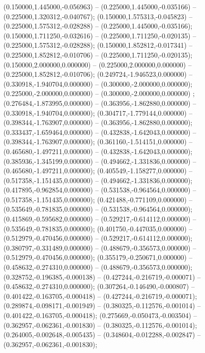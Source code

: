  (0.150000,1.445000,-0.056963) -- (0.225000,1.445000,-0.035166) -- (0.225000,1.320312,-0.040767);
 (0.150000,1.575313,-0.045823) -- (0.225000,1.575312,-0.028288) -- (0.225000,1.445000,-0.035166);
 (0.150000,1.711250,-0.032616) -- (0.225000,1.711250,-0.020135) -- (0.225000,1.575312,-0.028288);
 (0.150000,1.852812,-0.017341) -- (0.225000,1.852812,-0.010706) -- (0.225000,1.711250,-0.020135);
 (0.150000,2.000000,0.000000) -- (0.225000,2.000000,0.000000) -- (0.225000,1.852812,-0.010706);
 (0.249724,-1.946523,0.000000) -- (0.330918,-1.940704,0.000000) -- (0.300000,-2.000000,0.000000);
 (0.225000,-2.000000,0.000000) -- (0.300000,-2.000000,0.000000) ;
 (0.276484,-1.873995,0.000000) -- (0.363956,-1.862880,0.000000) -- (0.330918,-1.940704,0.000000);
 (0.304717,-1.779144,0.000000) -- (0.398344,-1.763907,0.000000) -- (0.363956,-1.862880,0.000000);
 (0.333437,-1.659464,0.000000) -- (0.432838,-1.642043,0.000000) -- (0.398344,-1.763907,0.000000);
 (0.361160,-1.514151,0.000000) -- (0.465680,-1.497211,0.000000) -- (0.432838,-1.642043,0.000000);
 (0.385936,-1.345199,0.000000) -- (0.494662,-1.331836,0.000000) -- (0.465680,-1.497211,0.000000);
 (0.405549,-1.158277,0.000000) -- (0.517358,-1.151435,0.000000) -- (0.494662,-1.331836,0.000000);
 (0.417895,-0.962854,0.000000) -- (0.531538,-0.964564,0.000000) -- (0.517358,-1.151435,0.000000);
 (0.421488,-0.771109,0.000000) -- (0.535649,-0.781835,0.000000) -- (0.531538,-0.964564,0.000000);
 (0.415869,-0.595682,0.000000) -- (0.529217,-0.614112,0.000000) -- (0.535649,-0.781835,0.000000);
 (0.401750,-0.447035,0.000000) -- (0.512979,-0.470456,0.000000) -- (0.529217,-0.614112,0.000000);
 (0.380797,-0.331489,0.000000) -- (0.488679,-0.356573,0.000000) -- (0.512979,-0.470456,0.000000);
 (0.355179,-0.250671,0.000000) -- (0.458632,-0.274310,0.000000) -- (0.488679,-0.356573,0.000000);
 (0.328752,-0.196385,-0.000138) -- (0.427244,-0.216719,-0.000071) -- (0.458632,-0.274310,0.000000);
 (0.307264,-0.146490,-0.000807) -- (0.401422,-0.163705,-0.000418) -- (0.427244,-0.216719,-0.000071);
 (0.289874,-0.098171,-0.001949) -- (0.380325,-0.112576,-0.001014) -- (0.401422,-0.163705,-0.000418);
 (0.275669,-0.050473,-0.003504) -- (0.362957,-0.062361,-0.001830) -- (0.380325,-0.112576,-0.001014);
 (0.264005,-0.002648,-0.005435) -- (0.348604,-0.012288,-0.002847) -- (0.362957,-0.062361,-0.001830);
